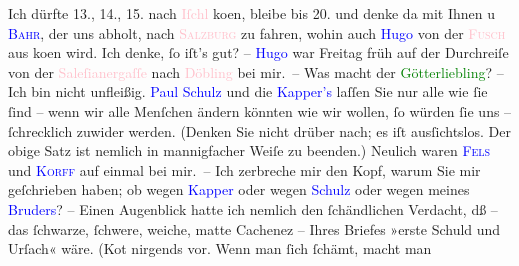            \pstart
           Ich dürfte 13., 14., 15. nach \textcolor{pink}{Iſchl}{}\ledrightnote{\textcolor{pink}{Bad Ischl}} ko{\geminationm}en, bleibe
                    bis 20. und denke da{\geminationn} mit Ihnen u
                        \textcolor{blue}{\textsc{Bahr}}{}\ledrightnote{\textcolor{blue}{Hermann Bahr}}, der uns abholt, nach \textsc{\textcolor{pink}{Salzburg}{}\ledrightnote{\textcolor{pink}{Salzburg}}} zu fahren, {\pb}wohin auch \textcolor{blue}{Hugo}{}\ledrightnote{\textcolor{blue}{Hugo von Hofmannsthal}} von der \textsc{\textcolor{pink}{Fusch}{}\ledrightnote{\textcolor{pink}{Bad Fusch}}} aus ko{\geminationm}en wird. Ich denke, ſo iſt’s gut?
                    –\pend
           \pstart
           \textcolor{blue}{Hugo}{}\ledrightnote{\textcolor{blue}{Hugo von Hofmannsthal}} war Freitag früh auf der Durchreiſe von
                    der \textcolor{pink}{Saleſianergaſſe}{}\ledrightnote{\textcolor{pink}{Salesianergasse}} nach \textcolor{pink}{Döbling}{}\ledrightnote{\textcolor{pink}{XIX., Döbling}} bei mir. –\pend
           \pstart
           Was macht der \textcolor{green}{Götterliebling}{}\ledrightnote{\textcolor{green}{Der Tod Georgs}}? – Ich bin nicht
                        un{\pb}fleißig. \textcolor{blue}{Paul
                        Schulz}{}\ledrightnote{\textcolor{blue}{Paul Schulz}} und die \textcolor{blue}{Kapper’s}{}\ledrightnote{\textcolor{blue}{Friedrich Kapper}{\newline}\textcolor{blue}{Adele Kapper}} laſſen Sie nur alle wie ſie ſind – wenn wir alle
                    Menſchen ändern könnten wie wir wollen, ſo würden ſie uns – ſchrecklich zuwider
                    werden. (Denken Sie nicht drüber nach; es iſt ausſichtslos. Der obige Satz ist
                    nemlich {\pb}in mannigfacher Weiſe zu beenden.)\pend
           \pstart
           Neulich waren \textcolor{blue}{\textsc{Fels}}{}\ledrightnote{\textcolor{blue}{Friedrich Michael Fels}}
                    und \textcolor{blue}{\textsc{Korff}}{}\ledrightnote{\textcolor{blue}{Heinrich von Korff}} auf
                    einmal bei mir. –\pend
           \pstart
           Ich zerbreche mir den Kopf, warum Sie mir geſchrieben haben; ob wegen \textcolor{blue}{Kapper}{}\ledrightnote{\textcolor{blue}{Friedrich Kapper}} oder wegen \textcolor{blue}{Schulz}{}\ledrightnote{\textcolor{blue}{Paul Schulz}} oder wegen meines \textcolor{blue}{Bruders}{}? – Einen Augenblick hatte ich nemlich den ſchändlichen Ver{\pb}dacht, dß – das ſchwarze, ſchwere, weiche, matte
                    Cachenez – Ihres Briefes »erste Schuld und Urſach« wäre. (Ko{\geminationm}t nirgends vor. Wenn man ſich ſchämt, macht man
